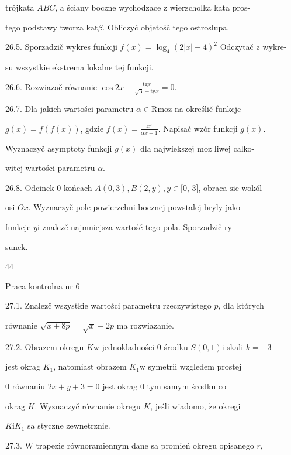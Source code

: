 \documentclass[a4paper,12pt]{article}
\begin{document}
trójkata $ABC$, a ściany boczne wychodzace $\mathrm{z}$ wierzcholka kata pros-

tego podstawy tworza $\mathrm{k}\mathrm{a}\mathrm{t}\beta$. Obliczyč objetośč tego ostroslupa.

26.5. Sporzadzič wykres funkcji $f(x)=\log_{4}(2|x|-4)^{2}$ Odczytač $\mathrm{z}$ wykre-

su wszystkie ekstrema lokalne tej funkcji.

26.6. Rozwiazač równanie $\displaystyle \cos 2x+\frac{\mathrm{t}\mathrm{g}x}{\sqrt{3}+\mathrm{t}\mathrm{g}x}=0.$

26.7. Dla jakich wartości parametru $\alpha \in \mathrm{R} \mathrm{m}\mathrm{o}\dot{\mathrm{z}}$ na określič funkcje

$g(x) = f(f(x))$, gdzie $f(x) = \displaystyle \frac{x^{2}}{\alpha x-1}$. Napisač wzór funkcji $g(x).$

Wyznaczyč asymptoty funkcji $g(x)$ dla najwiekszej $\mathrm{m}\mathrm{o}\dot{\mathrm{z}}$ liwej calko-

witej wartości parametru $\alpha.$

26.8. Odcinek $0$ końcach $A(0,3), B(2,y), y \in [0$, 3$]$, obraca $\mathrm{s}\mathrm{i}\mathrm{e}$ wokól

osi $Ox$. Wyznaczyč pole powierzchni bocznej powstalej bryly jako

funkcje $y \mathrm{i}$ znalez$\acute{}$č najmniejsza wartośč tego pola. Sporzadzič ry-

sunek.





44

Praca kontrolna nr 6

27.1. Znalez$\acute{}$č wszystkie wartości parametru rzeczywistego $p$, dla których

równanie $\sqrt{x+8p}=\sqrt{x}+2p$ ma rozwiazanie.

27.2. Obrazem okregu $K\mathrm{w}$ jednokladności $0$ środku $S(0,1)\mathrm{i}$ skali $k=-3$

jest okrag $K_{1}$, natomiast obrazem $K_{1} \mathrm{w}$ symetrii wzgledem prostej

$0$ równaniu $2x+y+3 = 0$ jest okrag $0$ tym samym środku co

okrag $K$. Wyznaczyč równanie okregu $K$, jeśli wiadomo, $\dot{\mathrm{z}}\mathrm{e}$ okregi

$K\mathrm{i}K_{1}$ sa styczne zewnetrznie.

27.3. $\mathrm{W}$ trapezie równoramiennym dane sa promień okregu opisanego $r,$
\end{document}

